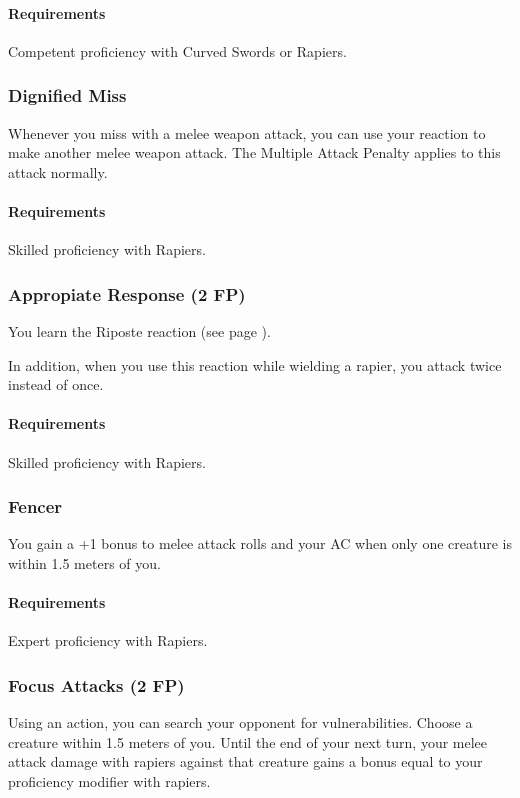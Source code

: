     \paragraph{Requirements} Competent proficiency with Curved Swords or Rapiers.
\subsubsection{Dignified Miss} \label{feat::dignifiedmiss}
    Whenever you miss with a melee weapon attack, you can use your reaction to make another melee weapon attack.
    The Multiple Attack Penalty applies to this attack normally.
    \paragraph{Requirements} Skilled proficiency with Rapiers.
\subsubsection{Appropiate Response (2 FP)} \label{feat::appropiateresponse}
    You learn the Riposte reaction (see page \pageref{act::riposte}).

    In addition, when you use this reaction while wielding a rapier, you attack twice instead of once.
    \paragraph{Requirements} Skilled proficiency with Rapiers.
\subsubsection{Fencer} \label{feat::fencer}
    You gain a +1 bonus to melee attack rolls and your AC when only one creature is within 1.5 meters of you.
    \paragraph{Requirements} Expert proficiency with Rapiers.
\subsubsection{Focus Attacks (2 FP)} \label{feat::focusattacks}
    Using an action, you can search your opponent for vulnerabilities.
    Choose a creature within 1.5 meters of you.
    Until the end of your next turn, your melee attack damage with rapiers against that creature gains a bonus equal to your proficiency modifier with rapiers.
